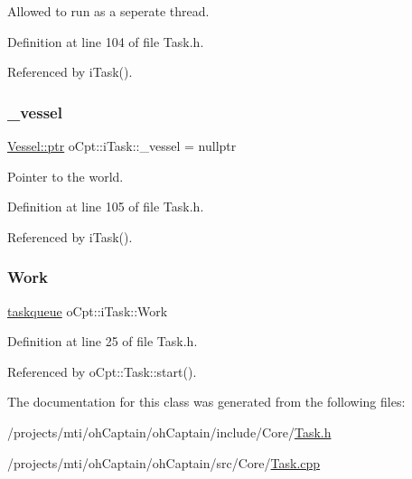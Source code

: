 Allowed to run as a seperate thread. 



Definition at line 104 of file Task.\+h.



Referenced by i\+Task().

\hypertarget{classo_cpt_1_1i_task_ac6cc57220c87f87cdd4d1749119ae0cb}{}\label{classo_cpt_1_1i_task_ac6cc57220c87f87cdd4d1749119ae0cb} 
\subsubsection{\texorpdfstring{\+\_\+vessel}{\_vessel}}
{\footnotesize\ttfamily \hyperlink{classo_cpt_1_1i_vessel_a43711a596f3bdfd0ca732ed3901edc97}{Vessel\+::ptr} o\+Cpt\+::i\+Task\+::\+\_\+vessel = nullptr\hspace{0.3cm}{\ttfamily [protected]}}



Pointer to the world. 



Definition at line 105 of file Task.\+h.



Referenced by i\+Task().

\hypertarget{classo_cpt_1_1i_task_a41287056bebbed04966072dfd1a9f80f}{}\label{classo_cpt_1_1i_task_a41287056bebbed04966072dfd1a9f80f} 
\subsubsection{\texorpdfstring{Work}{Work}}
{\footnotesize\ttfamily \hyperlink{classo_cpt_1_1i_task_a8f949d091241347ea0cdfb8625b4dbca}{taskqueue} o\+Cpt\+::i\+Task\+::\+Work}



Definition at line 25 of file Task.\+h.



Referenced by o\+Cpt\+::\+Task\+::start().



The documentation for this class was generated from the following files\+:\begin{DoxyCompactItemize}
\item 
/projects/mti/oh\+Captain/oh\+Captain/include/\+Core/\hyperlink{_task_8h}{Task.\+h}\item 
/projects/mti/oh\+Captain/oh\+Captain/src/\+Core/\hyperlink{_task_8cpp}{Task.\+cpp}\end{DoxyCompactItemize}

